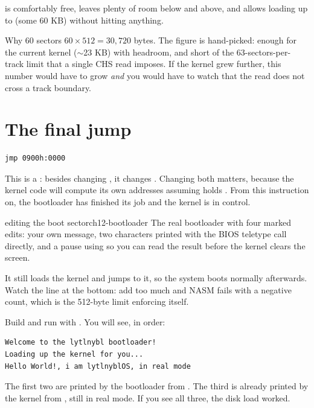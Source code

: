  is comfortably free, leaves plenty of room below and above, and allows loading up to
 (some 60 KB) without hitting anything.

\begin{concept}{Why 60 sectors}
$60 \times 512 = 30{,}720$ bytes. The figure is hand-picked: enough for the current kernel
($\sim$23 KB) with headroom, and short of the 63-sectors-per-track limit that a single CHS read
imposes. If the kernel grew further, this number would have to grow \emph{and} you would have to
watch that the read does not cross a track boundary.
\end{concept}

\section{The final jump}

\begin{lstlisting}[style=asm]
jmp 0900h:0000
\end{lstlisting}

This is a : besides changing , it changes . Changing both matters,
because the kernel code will compute its own addresses assuming  holds . From
this instruction on, the bootloader has finished its job and the kernel is in control.

\begin{recipe}{editing the boot sector}{ch12-bootloader}
The real bootloader with four marked edits: your own message, two characters printed with the BIOS
teletype call directly, and a pause using  so you can read the result before
the kernel clears the screen.

It still loads the kernel and jumps to it, so the system boots normally afterwards. Watch the
 line at the bottom: add too much and NASM fails with a negative count,
which is the 512-byte limit enforcing itself.
\end{recipe}

\begin{tryit}
Build and run with . You will see, in order:
\begin{lstlisting}[style=txt]
Welcome to the lytlnybl bootloader!
Loading up the kernel for you...
Hello World!, i am lytlnyblOS, in real mode
\end{lstlisting}
The first two are printed by the bootloader from . The third is already printed by the
kernel from , still in real mode. If you see all three, the disk load worked.
\end{tryit}


